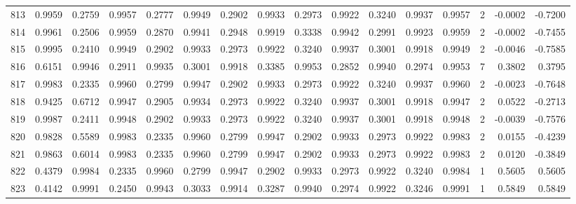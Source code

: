 \begin{tabular}{lrrrrrrrrrrrrrrr}
813 &      0.9959 &  0.2759 &  0.9957 &  0.2777 &  0.9949 &  0.2902 &  0.9933 &  0.2973 &  0.9922 &  0.3240 &   0.9937 &     0.9957 &      2 &                   -0.0002 &                    -0.7200 \\
814 &      0.9961 &  0.2506 &  0.9959 &  0.2870 &  0.9941 &  0.2948 &  0.9919 &  0.3338 &  0.9942 &  0.2991 &   0.9923 &     0.9959 &      2 &                   -0.0002 &                    -0.7455 \\
815 &      0.9995 &  0.2410 &  0.9949 &  0.2902 &  0.9933 &  0.2973 &  0.9922 &  0.3240 &  0.9937 &  0.3001 &   0.9918 &     0.9949 &      2 &                   -0.0046 &                    -0.7585 \\
816 &      0.6151 &  0.9946 &  0.2911 &  0.9935 &  0.3001 &  0.9918 &  0.3385 &  0.9953 &  0.2852 &  0.9940 &   0.2974 &     0.9953 &      7 &                    0.3802 &                     0.3795 \\
817 &      0.9983 &  0.2335 &  0.9960 &  0.2799 &  0.9947 &  0.2902 &  0.9933 &  0.2973 &  0.9922 &  0.3240 &   0.9937 &     0.9960 &      2 &                   -0.0023 &                    -0.7648 \\
818 &      0.9425 &  0.6712 &  0.9947 &  0.2905 &  0.9934 &  0.2973 &  0.9922 &  0.3240 &  0.9937 &  0.3001 &   0.9918 &     0.9947 &      2 &                    0.0522 &                    -0.2713 \\
819 &      0.9987 &  0.2411 &  0.9948 &  0.2902 &  0.9933 &  0.2973 &  0.9922 &  0.3240 &  0.9937 &  0.3001 &   0.9918 &     0.9948 &      2 &                   -0.0039 &                    -0.7576 \\
820 &      0.9828 &  0.5589 &  0.9983 &  0.2335 &  0.9960 &  0.2799 &  0.9947 &  0.2902 &  0.9933 &  0.2973 &   0.9922 &     0.9983 &      2 &                    0.0155 &                    -0.4239 \\
821 &      0.9863 &  0.6014 &  0.9983 &  0.2335 &  0.9960 &  0.2799 &  0.9947 &  0.2902 &  0.9933 &  0.2973 &   0.9922 &     0.9983 &      2 &                    0.0120 &                    -0.3849 \\
822 &      0.4379 &  0.9984 &  0.2335 &  0.9960 &  0.2799 &  0.9947 &  0.2902 &  0.9933 &  0.2973 &  0.9922 &   0.3240 &     0.9984 &      1 &                    0.5605 &                     0.5605 \\
823 &      0.4142 &  0.9991 &  0.2450 &  0.9943 &  0.3033 &  0.9914 &  0.3287 &  0.9940 &  0.2974 &  0.9922 &   0.3246 &     0.9991 &      1 &                    0.5849 &                     0.5849 \\

\end{tabular}
